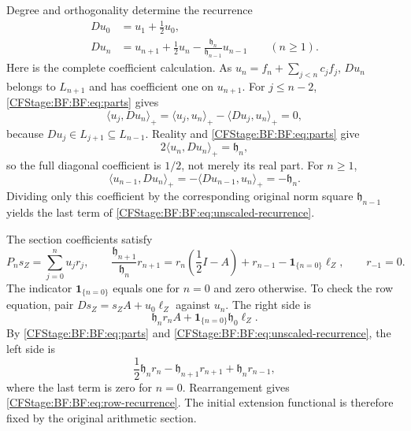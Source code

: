 Degree and orthogonality determine the recurrence
\begin{equation}
\begin{split}
Du_0&=u_1+\frac12u_0,\\
Du_n&=u_{n+1}+\frac12u_n
          -\frac{\mathfrak h_n}{\mathfrak h_{n-1}}u_{n-1}
          \qquad(n\ge1).
\end{split}
\tag{BF.14}\label{CFStage:BF:BF:eq:unscaled-recurrence}
\end{equation}
Here is the complete coefficient calculation.  As
\(u_n=f_n+\sum_{j<n}c_jf_j\), \(Du_n\) belongs to \(L_{n+1}\)
and has coefficient one on \(u_{n+1}\).
For \(j\le n-2\), \eqref{CFStage:BF:BF:eq:parts} gives
\[
\langle u_j,Du_n\rangle_+
=\langle u_j,u_n\rangle_+-\langle Du_j,u_n\rangle_+=0,
\]
because \(Du_j\in L_{j+1}\subseteq L_{n-1}\).
Reality and \eqref{CFStage:BF:BF:eq:parts} give
\[
2\langle u_n,Du_n\rangle_+=\mathfrak h_n,
\]
so the full diagonal coefficient is \(1/2\), not merely its real
part.  For \(n\ge1\),
\[
\langle u_{n-1},Du_n\rangle_+
=-\langle Du_{n-1},u_n\rangle_+=-\mathfrak h_n.
\]
Dividing only this coefficient by the corresponding original norm
square \(\mathfrak h_{n-1}\) yields the last term of
\eqref{CFStage:BF:BF:eq:unscaled-recurrence}.

The section coefficients satisfy
\begin{equation}
P_ns_Z=\sum_{j=0}^nu_jr_j,\qquad
\frac{\mathfrak h_{n+1}}{\mathfrak h_n}r_{n+1}
=r_n\left(\frac12I-A\right)+r_{n-1}
   -\mathbf 1_{\{n=0\}}\ell_Z,\qquad r_{-1}=0.
\tag{BF.15}\label{CFStage:BF:BF:eq:row-recurrence}
\end{equation}
The indicator \(\mathbf 1_{\{n=0\}}\) equals one for \(n=0\)
and zero otherwise.  To check the row equation, pair
\(Ds_Z=s_ZA+u_0\ell_Z\) against \(u_n\).
The right side is
\[
\mathfrak h_nr_nA+\mathbf 1_{\{n=0\}}\mathfrak h_0\ell_Z.
\]
By \eqref{CFStage:BF:BF:eq:parts} and \eqref{CFStage:BF:BF:eq:unscaled-recurrence}, the
left side is
\[
\frac12\mathfrak h_nr_n-\mathfrak h_{n+1}r_{n+1}
+\mathfrak h_nr_{n-1},
\]
where the last term is zero for \(n=0\).  Rearrangement gives
\eqref{CFStage:BF:BF:eq:row-recurrence}.  The initial extension functional is
therefore fixed by the original arithmetic section.

